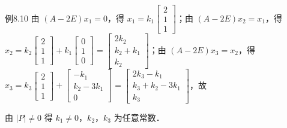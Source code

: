 \begin{fcard}{例8.10}
由 $(A-2E)x_1=0$，得 $x_1=k_1\begin{bmatrix}2\\1\\1\end{bmatrix}$；由 $(A-2E)x_2=x_1$，得 $x_2=k_2\begin{bmatrix}2\\1\\1\end{bmatrix}+k_1\begin{bmatrix}0\\1\\0\end{bmatrix}=\begin{bmatrix}2k_2\\k_2+k_1\\k_2\end{bmatrix}$；由 $(A-2E)x_3=x_2$，得 $x_3=k_3\begin{bmatrix}2\\1\\1\end{bmatrix}+\begin{bmatrix}-k_1\\k_2-3k_1\\0\end{bmatrix}=\begin{bmatrix}2k_3-k_1\\k_3+k_2-3k_1\\k_3\end{bmatrix}$，故


由 $|P|\ne0$ 得 $k_1\ne0$，$k_2$，$k_3$ 为任意常数．
\end{fcard}



